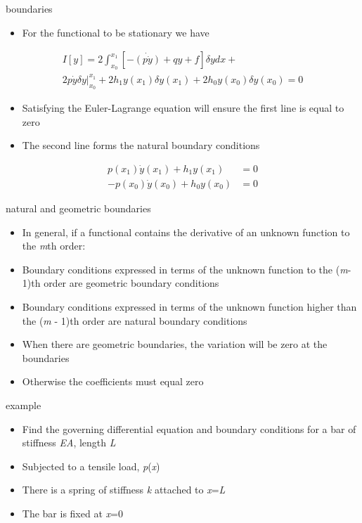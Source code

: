 \documentclass[
  letterpaper,
  ignorenonframetext,
  aspectratio=43,
  handout,
  12pt]{beamer}
\providecommand{\tightlist}{%
  \setlength{\itemsep}{0pt}\setlength{\parskip}{0pt}}
\providecommand{\tightlist}{%
\setlength{\itemsep}{0pt}\setlength{\parskip}{0pt}}
\begin{document}
\begin{frame}{boundaries}
\protect\hypertarget{boundaries-1}{}
\begin{itemize}
\tightlist
\item
  For the functional to be stationary we have
\end{itemize}

\[\begin{gathered}
  I[y] = 2\int_{x_0}^{x_1} [-\dot{(p\dot{y})} + qy + f]\delta y dx + \\
  2p\dot{y} \delta y|_{x_0}^{x_1} + 2h_1y(x_1)\delta y(x_1) + 2h_0y(x_0)\delta y(x_0) = 0
\end{gathered}\]

\begin{itemize}
\tightlist
\item
  Satisfying the Euler-Lagrange equation will ensure the first line is
  equal to zero
\item
  The second line forms the natural boundary conditions
\end{itemize}

\[\begin{aligned}
  p(x_1) \dot{y}(x_1) + h_1 y(x_1) &= 0\\
  -p(x_0) \dot{y}(x_0) + h_0 y(x_0) &= 0
\end{aligned}\]
\end{frame}

\begin{frame}{natural and geometric boundaries}
\protect\hypertarget{natural-and-geometric-boundaries}{}
\begin{itemize}
\tightlist
\item
  In general, if a functional contains the derivative of an unknown
  function to the \emph{m}th order:
\item
  Boundary conditions expressed in terms of the unknown function to the
  (\emph{m}-1)th order are geometric boundary conditions
\item
  Boundary conditions expressed in terms of the unknown function higher
  than the (\emph{m} - 1)th order are natural boundary conditions
\item
  When there are geometric boundaries, the variation will be zero at the
  boundaries
\item
  Otherwise the coefficients must equal zero
\end{itemize}
\end{frame}

\begin{frame}{example}
\protect\hypertarget{example}{}
\begin{itemize}
\tightlist
\item
  Find the governing differential equation and boundary conditions for a
  bar of stiffness \emph{EA}, length \emph{L}
\item
  Subjected to a tensile load, \emph{p}(\emph{x})
\item
  There is a spring of stiffness \emph{k} attached to \emph{x}=\emph{L}
\item
  The bar is fixed at \emph{x}=0
\end{itemize}
\end{frame}
\end{document}
